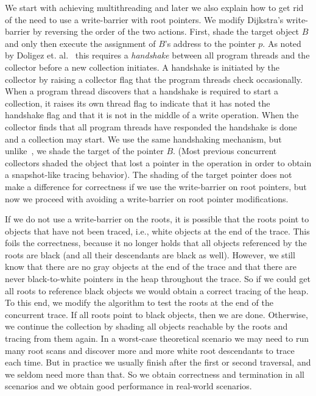 We start with achieving multithreading and later we also explain how to get rid of the need to use a write-barrier with root pointers. We modify Dijkstra's write-barrier by reversing the order of the two actions. First, shade the target object $B$ and only then execute the assignment of $B$'s address to the pointer $p$. As noted by Doligez et. al.~\cite{doli93,doli94} this requires a {\em handshake} between all program threads and the collector before a new collection initiates. A handshake is initiated by the collector by raising a collector flag that the program threads check occasionally. When a program thread discovers that a handshake is required to start a collection, it raises its own thread flag to indicate that it has noted the handshake flag and that it is not in the middle of a write operation. When the collector finds that all program threads have responded the handshake is done and a collection may start. We use the same handshaking mechanism, but unlike~\cite{doli93,doli94}, we shade the target of the pointer $B$. (Most previous concurrent collectors shaded the object that lost a pointer in the operation in order to obtain a snapshot-like tracing behavior). The shading of the target pointer does not make a difference for
correctness if we use the write-barrier on root pointers, but now we proceed with avoiding a write-barrier on root pointer modifications. 

If we do not use a write-barrier on the roots, it is possible that the roots point to objects that have not been traced, i.e., white objects at the end of the trace. This foils the correctness, because it no longer holds that all objects referenced by the roots are black (and all their descendants are black as well). However, we still know that there are no gray objects at the end of the trace and that there are never black-to-white pointers in the heap throughout the trace. So if we could get all roots to reference black objects we would obtain a correct tracing of the heap. To this end, we modify the algorithm to test the roots at the end of the concurrent trace. If all roots point to black objects, then we are done. Otherwise, we continue the collection by shading all objects reachable by the roots and tracing from them again. 
In a worst-case theoretical scenario we may need to run many root scans and discover more and more white root descendants to trace each time. 
But in practice we usually finish after the first or second traversal, and we seldom need more than that. So we obtain correctness and termination in all scenarios and we obtain good performance in real-world scenarios. 

